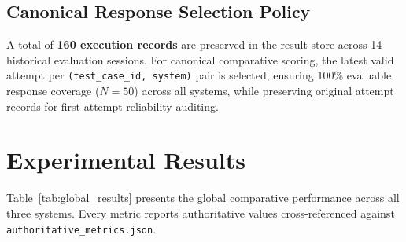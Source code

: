 \documentclass[conference]{IEEEtran}
\begin{document}
\subsection{Canonical Response Selection Policy}
A total of \textbf{160 execution records} are preserved in the result store across 14 historical evaluation sessions. For canonical comparative scoring, the latest valid attempt per \texttt{(test\_case\_id, system)} pair is selected, ensuring 100\% evaluable response coverage ($N=50$) across all systems, while preserving original attempt records for first-attempt reliability auditing.

\section{Experimental Results}

Table~\ref{tab:global_results} presents the global comparative performance across all three systems. Every metric reports authoritative values cross-referenced against \texttt{authoritative\_metrics.json}.
\end{document}
